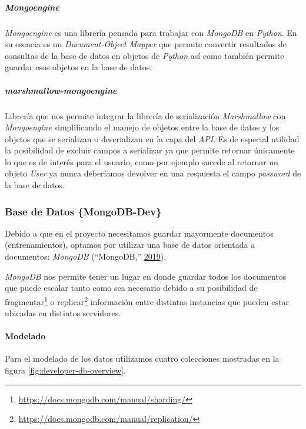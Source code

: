 \documentclass[12pt,a4paper,]{scrartcl}
\let\oldparagraph\paragraph
\renewcommand{\paragraph}[1]{\oldparagraph{#1}\mbox{}}
\let\oldsubparagraph\subparagraph
\renewcommand{\subparagraph}[1]{\oldsubparagraph{#1}\mbox{}}
\let\rmarkdownfootnote\footnote%
\def\footnote{\protect\rmarkdownfootnote}
\begin{document}
\hypertarget{mongoengine}{%
\subparagraph{\texorpdfstring{\emph{Mongoengine}}{Mongoengine}}\label{mongoengine}}

\emph{Mongoengine} es una librería pensada para trabajar con \emph{MongoDB} en \emph{Python}. En su esencia es un \emph{Document-Object Mapper} que permite convertir resultados de consultas de la base de datos en objetos de \emph{Python} así como también permite guardar esos objetos en la base de datos.

\hypertarget{marshmallow-mongoengine}{%
\subparagraph{\texorpdfstring{\emph{marshmallow-mongoengine}}{marshmallow-mongoengine}}\label{marshmallow-mongoengine}}

Librería que nos permite integrar la librería de serialización \emph{Marshmallow} con \emph{Mongoengine} simplificando el manejo de objetos entre la base de datos y los objetos que se serializan o deserializan en la capa del \emph{API}. Es de especial utilidad la posibilidad de excluir campos a serializar ya que permite retornar únicamente lo que es de interés para el usuario, como por ejemplo sucede al retornar un objeto \emph{User} ya nunca deberíamos devolver en una respuesta el campo \emph{password} de la base de datos.

\hypertarget{base-de-datos-mongodb-dev}{%
\subsubsection{Base de Datos \{MongoDB-Dev\}}\label{base-de-datos-mongodb-dev}}

Debido a que en el proyecto necesitamos guardar mayormente documentos (entrenamientos), optamos por utilizar una base de datos orientada a documentos: \emph{MongoDB} (``MongoDB,'' \protect\hyperlink{ref-mongodb}{2019}).

\emph{MongoDB} nos permite tener un lugar en donde guardar todos los documentos que puede escalar tanto como sea necesario debido a su posibilidad de fragmentar\footnote{\url{https://docs.mongodb.com/manual/sharding/}} o replicar\footnote{\url{https://docs.mongodb.com/manual/replication/}} información entre distintas instancias que pueden estar ubicadas en distintos servidores.

\hypertarget{modelado}{%
\paragraph{Modelado}\label{modelado}}

Para el modelado de los datos utilizamos cuatro colecciones mostradas en la figura \ref{fig:developer-db-overview}.
\end{document}
